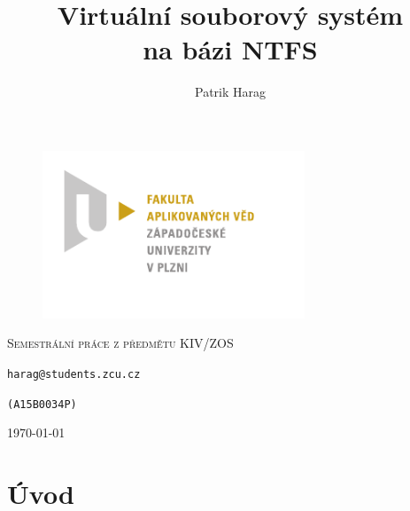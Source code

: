 \documentclass[12pt, a4paper]{report}
\title{Virtuální souborový systém\\na bázi NTFS}
\author{Patrik Harag}
\makeatletter
\def \thesubtitle {Semestrální práce z předmětu KIV/ZOS}
\def \theauthoremail {harag@students.zcu.cz}
\def \theauthorid {(A15B0034P)}
\makeatother
\begin{document}
\begin{titlepage}
	\begin{figure}
		\includegraphics[height=50mm]{img-fav-logo}
	\end{figure}
	
	\centering
	{\large \hspace{1mm} \par} %
	\vspace{15ex}
	
	{\scshape\Large \thesubtitle \par}
	\vspace{1.5ex}
	{\huge\bfseries \thetitle \par}
	\vspace{2ex}
	{\Large\itshape \theauthor \par}
	\vspace{2ex}
	{\texttt{\theauthoremail} \par}
	\vspace{1ex}
	{\texttt{\theauthorid} \par}
	\vspace{5ex}
	
	\vfill

	{\large \today\par}
\end{titlepage}

\setcounter{page}{0} 
\tableofcontents
\thispagestyle{empty}


\chapter{Úvod}
\end{document}
